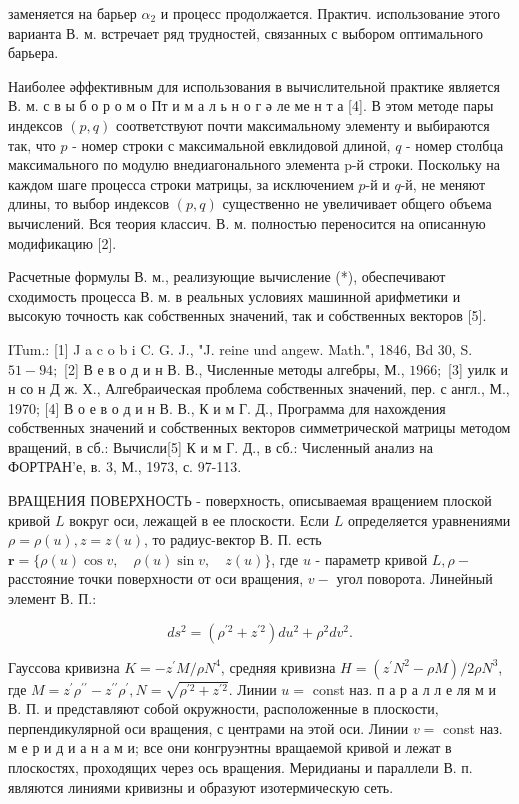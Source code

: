 \documentclass[10pt]{article}
\begin{document}
заменяется на барьер $\alpha_{2}$ и процесс продолжается. Практич. использование этого варианта В. м. встречает ряд трудностей, связанных с выбором оптимального барьера.



Наиболее әффективным для использования в вычислительной практике является В. м. с в ы б о р о м о Пт и м а л ь н о г ә ле ме н т а [4]. В этом методе пары индексов $(p, q)$ соответствуют почти максимальному элементу и выбираются так, что $p$ - номер строки с максимальной евклидовой длиной, $q$ - номер столбца максимального по модулю внедиагонального элемента p-й строки. Поскольку на каждом шаге процесса строки матрицы, за исключением $p$-й и $q$-й, не меняют длины, то выбор индексов $(p, q)$ существенно не увеличивает общего объема вычислений. Вся теория классич. В. м. полностью переносится на описанную модификацию [2].



Расчетные формулы В. м., реализующие вычисление (*), обеспечивают сходимость процесса В. м. в реальных условиях машинной арифметики и высокую точность как собственных значений, так и собственных векторов [5].



ITum.: [1] J a c o b i C. G. J., "J. reine und angew. Math.", 1846, Bd 30, S. $51-94 ;$ [2] В е в о д и н В. В., Численные методы алгебры, М., $1966 ;$ [3] уилк и н со н Д ж. Х., Алгебраическая проблема собственных значений, пер. с англ., М., 1970; [4] В о е в о д и н В. В., К и м Г. Д., Программа для нахождения собственных значений и собственных векторов симметрической матрицы методом вращений, в сб.: Вычисли[5] К и м Г. Д., в сб.: Численный анализ на ФОРТРАН'е, в. 3, М., 1973, с. 97-113.



ВРАЩЕНИЯ ПОВЕРХНОСТЬ - поверхность, описываемая вращением плоской кривой $L$ вокруг оси, лежащей в ее плоскости. Если $L$ определяется уравнениями $\rho=\rho(u), z=z(u)$, то радиус-вектор В. П. есть $\boldsymbol{r}=\{\rho(u) \cos v, \quad \rho(u) \sin v, \quad z(u)\}$, где $u$ - параметр кривой $L, \rho-$ расстояние точки поверхности от оси вращения, $v-$ угол поворота. Линейный элемент В. П.:



\[

d s^{2}=\left(\rho^{\prime 2}+z^{\prime 2}\right) d u^{2}+\rho^{2} d v^{2} .

\]



Гауссова кривизна $K=-z^{\prime} M / \rho N^{4}$, средняя кривизна $H=\left(z^{\prime} N^{2}-\rho M\right) / 2 \rho N^{3}$, где $M=z^{\prime} \rho^{\prime \prime}-z^{\prime \prime} \rho^{\prime}, N=\sqrt{\rho^{\prime 2}+z^{\prime 2}}$. Линии $u=$ const наз. п а р а л л е ля м и В. П. и представляют собой окружности, расположенные в плоскости, перпендикулярной оси вращения, с центрами на этой оси. Линии $v=$ const наз. м е р и д и а н а м и; все они конгруэнтны вращаемой кривой и лежат в плоскостях, проходящих через ось вращения. Меридианы и параллели В. п. являются линиями кривизны и образуют изотермическую сеть.
\end{document}
